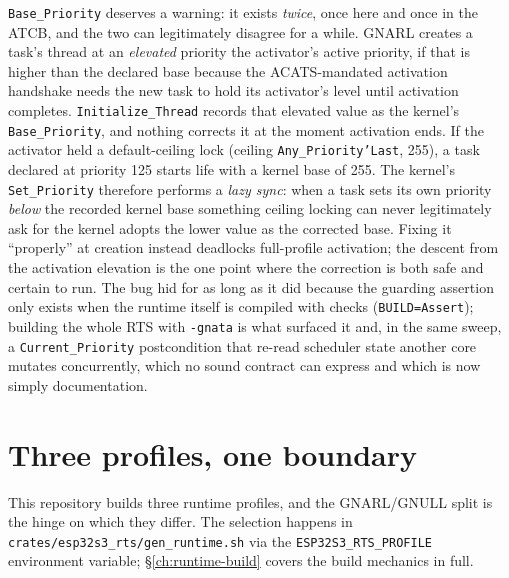 \texttt{Base\_Priority} deserves a warning: it exists \emph{twice}, once here
and once in the ATCB, and the two can legitimately disagree for a
while. GNARL creates a
task's thread at an \emph{elevated} priority \textemdash{} the activator's
active priority, if that is higher than the declared base \textemdash{}
because the ACATS-mandated activation handshake needs the new task to hold
its activator's level until activation completes. \texttt{Initialize\_Thread}
records that elevated value as the kernel's \texttt{Base\_Priority}, and
nothing corrects it at the moment activation ends. If the activator held a
default-ceiling lock (ceiling \texttt{Any\_Priority'Last}, 255), a task
declared at priority 125 starts life with a kernel base of 255. The kernel's
\texttt{Set\_Priority} therefore performs a \emph{lazy sync}: when a task
sets its own priority \emph{below} the recorded kernel base \textemdash{}
something ceiling locking can never legitimately ask for \textemdash{} the
kernel adopts the lower value as the corrected base. Fixing it ``properly''
at creation instead deadlocks full-profile activation; the descent from the
activation elevation is the one point where the correction is both safe and
certain to run. The bug hid for as long as it did because the guarding
assertion only exists when the runtime itself is compiled with checks
(\texttt{BUILD=Assert}); building the whole RTS with \texttt{-gnata} is what
surfaced it \textemdash{} and, in the same sweep, a
\texttt{Current\_Priority} postcondition that re-read scheduler state another
core mutates concurrently, which no sound contract can express and which is
now simply documentation.

\section{Three profiles, one boundary}

This repository builds three runtime profiles, and the GNARL/GNULL split is the
hinge on which they differ. The selection happens in
\texttt{crates/esp32s3\_rts/gen\_runtime.sh} via the \texttt{ESP32S3\_RTS\_PROFILE}
environment variable; \S\ref{ch:runtime-build} covers the build mechanics in
full.

